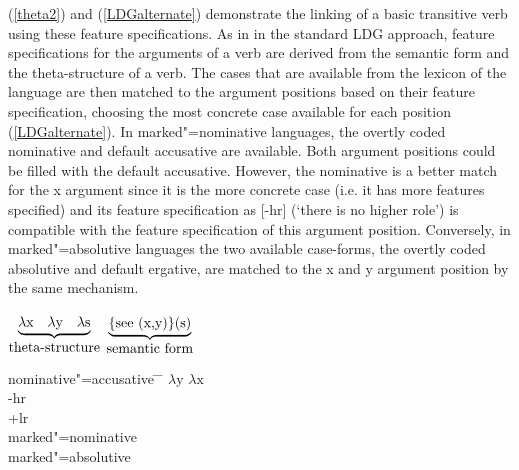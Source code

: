 (\ref{theta2}) and (\ref{LDGalternate}) demonstrate the linking of a basic transitive verb using these feature specifications. 
As in in the standard LDG approach, feature specifications for the arguments of a verb are derived from the semantic form and the theta-structure of a verb.
The cases that are available from the lexicon of the language are then matched to the argument positions based on their feature specification, choosing the most concrete case available for each position (\ref{LDGalternate}). 
In marked"=nominative languages, the overtly coded nominative and default accusative are available. 
Both argument positions could be filled with the default accusative.
However, the nominative is a better match for the x argument since it is the more concrete case (i.e. it has more features specified) and its feature specification as [-hr] (`there is no higher role') is compatible with the feature specification of this argument position. 
Conversely, in marked"=absolutive languages the two available case-forms, the overtly coded absolutive and default ergative, are matched to the x and y argument position by the same mechanism.  


\begin{exe}\ex\label{theta2}
$ \underbrace{ \lambda \text{x} \quad \lambda \text{y} \quad \lambda \text{s}}_{\text{\normalsize\rm
      theta-structure}}$ \qquad $ \underbrace{\{ \text{see (x,y)} \}
    \text{(s)}}_{\text{\normalsize\rm semantic form}} $ 
\end{exe}

\begin{exe}
\ex\label{LDGalternate}
\begin{tabbing}
nominative"=accusative \quad \= \nom{} \quad \= \kill
{}\>$\lambda \text{y}$ \> $\lambda \text{x}$\\
{} \> {-hr}\\
{} \> {+lr}\\
marked"=nominative\>\acc{}	\> \nom{}\\
marked"=absolutive\>\abs{} \> \erg{}
\end{tabbing}
\end{exe}

